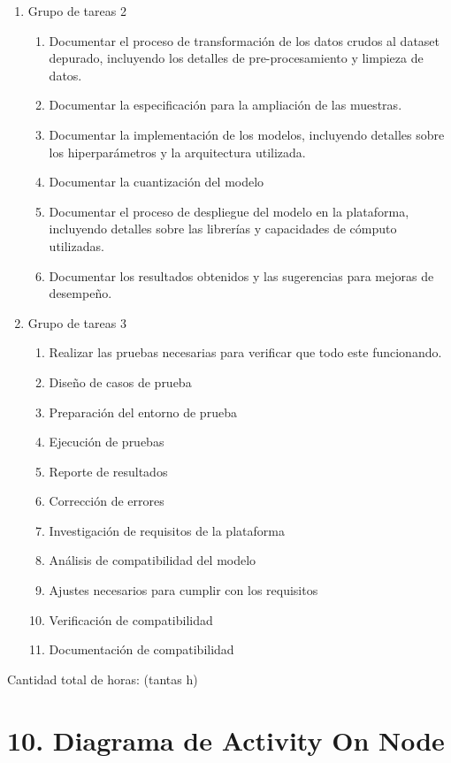 \documentclass[
11pt, %
codirector, %
]{charter}
\begin{document}
\begin{enumerate}
\begin{enumerate}
	\end{enumerate}
\item Grupo de tareas 2
	\begin{enumerate}
	\item Documentar el proceso de transformación de los datos crudos al dataset depurado, incluyendo los detalles de pre-procesamiento y limpieza de datos.
	\item Documentar la especificación para la ampliación de las muestras.
	\item Documentar la implementación de los modelos, incluyendo detalles sobre los hiperparámetros y la arquitectura utilizada.
	\item Documentar la cuantización del modelo
	\item Documentar el proceso de despliegue del modelo en la plataforma, incluyendo detalles sobre las librerías y capacidades de cómputo utilizadas.
	\item Documentar los resultados obtenidos y las sugerencias para mejoras de desempeño.
	\end{enumerate}
\item Grupo de tareas 3
	\begin{enumerate}
	\item Realizar las pruebas necesarias para verificar que todo este funcionando.
	\item Diseño de casos de prueba
	\item Preparación del entorno de prueba
	\item Ejecución de pruebas
	\item Reporte de resultados
	\item Corrección de errores
	\item Investigación de requisitos de la plataforma
	\item Análisis de compatibilidad del modelo
	\item Ajustes necesarios para cumplir con los requisitos
	\item Verificación de compatibilidad
	\item Documentación de compatibilidad
	
	\end{enumerate}
\end{enumerate}

Cantidad total de horas: (tantas h)




\section{10. Diagrama de Activity On Node}
\label{sec:AoN}
\end{document}
